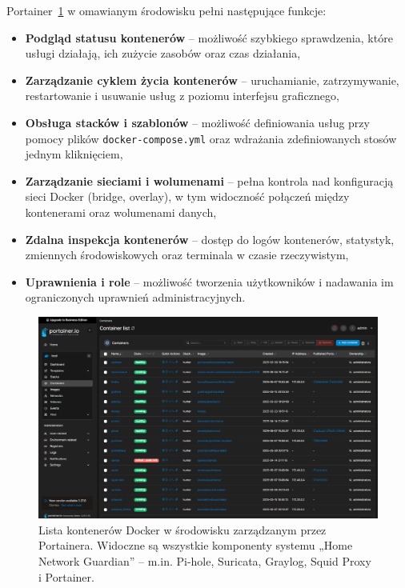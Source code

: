 \documentclass[
    left=2.5cm,         %
    right=2.5cm,        %
    top=2.5cm,          %
    bottom=3cm,         %
    bindingoffset=6mm,  %
    nohyphenation=true %
]{eiti/eiti-thesis} %
\begin{document}
Portainer~\ref{fig:portainer-containers} w omawianym środowisku pełni następujące funkcje:
\begin{itemize}
    \item \textbf{Podgląd statusu kontenerów} – możliwość szybkiego sprawdzenia, które usługi działają, ich zużycie zasobów oraz czas działania,
    \item \textbf{Zarządzanie cyklem życia kontenerów} – uruchamianie, zatrzymywanie, restartowanie i usuwanie usług z poziomu interfejsu graficznego,
    \item \textbf{Obsługa stacków i szablonów} – możliwość definiowania usług przy pomocy plików \texttt{docker-compose.yml} oraz wdrażania zdefiniowanych stosów jednym kliknięciem,
    \item \textbf{Zarządzanie sieciami i wolumenami} – pełna kontrola nad konfiguracją sieci Docker (bridge, overlay), w tym widoczność połączeń między kontenerami oraz wolumenami danych,
    \item \textbf{Zdalna inspekcja kontenerów} – dostęp do logów kontenerów, statystyk, zmiennych środowiskowych oraz terminala w czasie rzeczywistym,
    \item \textbf{Uprawnienia i role} – możliwość tworzenia użytkowników i nadawania im ograniczonych uprawnień administracyjnych.
\end{itemize}
\newpage 
\begin{figure}[H]
    \centering
    \includegraphics[width=\textwidth]{img/portainer_list.png}
    \caption{Lista kontenerów Docker w środowisku zarządzanym przez Portainera. Widoczne są wszystkie komponenty systemu „Home Network Guardian” – m.in. Pi-hole, Suricata, Graylog, Squid Proxy i Portainer.}
    \label{fig:portainer-containers}
\end{figure}
\end{document}
